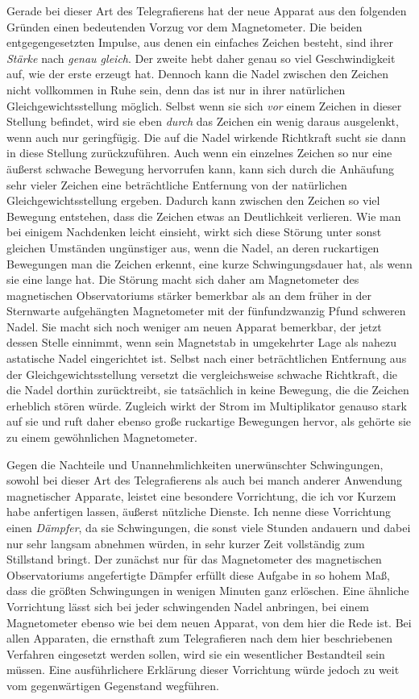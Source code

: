 Gerade bei dieser Art des Telegrafierens hat der neue Apparat aus den folgenden Gründen einen bedeutenden Vorzug vor dem Magnetometer. Die beiden entgegengesetzten Impulse, aus denen ein einfaches Zeichen besteht, sind ihrer \textit{Stärke} nach \textit{genau gleich}. Der zweite hebt daher genau so viel Geschwindigkeit auf, wie der erste erzeugt hat. Dennoch kann die Nadel zwischen den Zeichen nicht vollkommen in Ruhe sein, denn das ist nur in ihrer natürlichen Gleichgewichtsstellung möglich. Selbst wenn sie sich \textit{vor} einem Zeichen in dieser Stellung befindet, wird sie eben \textit{durch} das Zeichen ein wenig daraus ausgelenkt, wenn auch nur geringfügig. Die auf die Nadel wirkende Richtkraft sucht sie dann in diese Stellung zurückzuführen. Auch wenn ein einzelnes Zeichen so nur eine äußerst schwache Bewegung hervorrufen kann, kann sich durch die Anhäufung sehr vieler Zeichen eine beträchtliche Entfernung von der natürlichen Gleichgewichtsstellung ergeben. Dadurch kann zwischen den Zeichen so viel Bewegung entstehen, dass die Zeichen etwas an Deutlichkeit verlieren. Wie man bei einigem Nachdenken leicht einsieht, wirkt sich diese Störung unter sonst gleichen Umständen ungünstiger aus, wenn die Nadel, an deren ruckartigen Bewegungen man die Zeichen erkennt, eine kurze Schwingungsdauer hat, als wenn sie eine lange hat. Die Störung macht sich daher am Magnetometer des magnetischen Observatoriums stärker bemerkbar als an dem früher in der Sternwarte aufgehängten Magnetometer mit der fünfundzwanzig Pfund schweren Nadel. Sie macht sich noch weniger am neuen Apparat bemerkbar, der jetzt dessen Stelle einnimmt, wenn sein Magnetstab in umgekehrter Lage als nahezu astatische Nadel eingerichtet ist. Selbst nach einer beträchtlichen Entfernung aus der Gleichgewichtsstellung versetzt die vergleichsweise schwache Richtkraft, die die Nadel dorthin zurücktreibt, sie tatsächlich in keine Bewegung, die die Zeichen erheblich stören würde. Zugleich wirkt der Strom im Multiplikator genauso stark auf sie und ruft daher ebenso große ruckartige Bewegungen hervor, als gehörte sie zu einem gewöhnlichen Magnetometer.

Gegen die Nachteile und Unannehmlichkeiten unerwünschter Schwingungen, sowohl bei dieser Art des Telegrafierens als auch bei manch anderer Anwendung magnetischer Apparate, leistet eine besondere Vorrichtung, die ich vor Kurzem habe anfertigen lassen, äußerst nützliche Dienste. Ich nenne diese Vorrichtung einen \textit{Dämpfer}, da sie Schwingungen, die sonst viele Stunden andauern und dabei nur sehr langsam abnehmen würden, in sehr kurzer Zeit vollständig zum Stillstand bringt. Der zunächst nur für das Magnetometer des magnetischen Observatoriums angefertigte Dämpfer erfüllt diese Aufgabe in so hohem Maß, dass die größten Schwingungen in wenigen Minuten ganz erlöschen. Eine ähnliche Vorrichtung lässt sich bei jeder schwingenden Nadel anbringen, bei einem Magnetometer ebenso wie bei dem neuen Apparat, von dem hier die Rede ist. Bei allen Apparaten, die ernsthaft zum Telegrafieren nach dem hier beschriebenen Verfahren eingesetzt werden sollen, wird sie ein wesentlicher Bestandteil sein müssen. Eine ausführlichere Erklärung dieser Vorrichtung würde jedoch zu weit vom gegenwärtigen Gegenstand wegführen.

